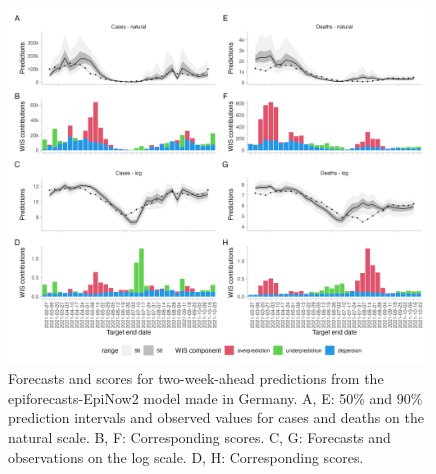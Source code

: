 \documentclass{article}
\begin{document}
\begin{figure}[h!]
    \centering
    \includegraphics[width=0.99\textwidth]{output/figures/HUB-model-comparison-epinow.png}
    \caption{
    Forecasts and scores for two-week-ahead predictions from the epiforecasts-EpiNow2 model made in Germany. A, E: 50\% and 90\% prediction intervals and observed values for cases and deaths on the natural scale. B, F: Corresponding scores. C, G: Forecasts and observations on the log scale. D, H: Corresponding scores. 
    }
    \label{fig:HUB-model-comparison-epinow}
\end{figure}
\end{document}
